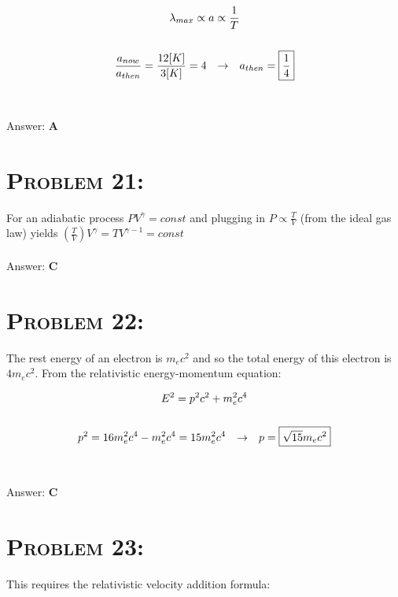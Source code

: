 \documentclass{article}
\begin{document}
\begin{gather}
\lambda_{max} \propto a \propto \frac{1}{T} \\
\nonumber\\
\frac{a_{now}}{a_{then}} = \frac{12 [K]}{3 [K]} = 4\hspace{.1in} \rightarrow \hspace{.1in} a_{then} = \boxed{\frac{1}{4}}\nonumber
\end{gather}
\\\\
Answer: \textbf{\textcolor{ProcessBlue}A}\\


\section{\textsc{Problem 21:}}  For an adiabatic process $P V^\gamma = const$ and plugging in $P \propto \frac{T}{V}$ (from the ideal gas law) yields $\left(\frac{T}{V}\right) V^\gamma = T V^{\gamma-1}= const$
\\\\
Answer: \textbf{\textcolor{ProcessBlue}C}\\


\section{\textsc{Problem 22:}}  The rest energy of an electron is $m_e c^2$ and so the total energy of this electron is $4 m_e c^2$. From the relativistic energy-momentum equation:

\begin{gather}
E^2 = p^2c^2 + m_e^2 c^4\\
\nonumber\\
p^2 = 16 m_e^2 c^4 - m_e^2 c^4 = 15 m_e^2 c^4\hspace{.1in} \rightarrow \hspace{.1in} p = \boxed{\sqrt{15}m_e c^2}\nonumber
\end{gather}
\\\\
Answer: \textbf{\textcolor{ProcessBlue}C}\\


\section{\textsc{Problem 23:}} This requires the relativistic velocity addition formula:
\end{document}
